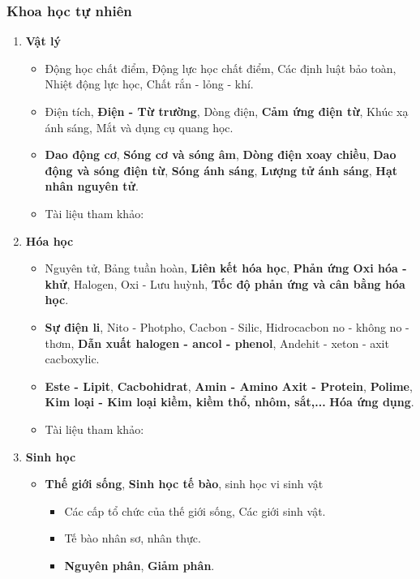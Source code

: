 \subsubsection{Khoa học tự nhiên}
\begin{enumerate}
    \item \textbf{Vật lý}
    \begin{itemize}
        \item Động học chất điểm, Động lực học chất điểm, Các định luật bảo toàn, Nhiệt động lực học, Chất rắn - lỏng - khí.
        \item Điện tích, \textbf{Điện - Từ trường}, Dòng điện, \textbf{Cảm ứng điện từ}, Khúc xạ ánh sáng, Mắt và dụng cụ quang học.
        \item \textbf{Dao động cơ}, \textbf{Sóng cơ và sóng âm}, \textbf{Dòng điện xoay chiều}, \textbf{Dao động và sóng điện từ}, \textbf{Sóng ánh sáng}, \textbf{Lượng tử ánh sáng}, \textbf{Hạt nhân nguyên tử}.
        \item Tài liệu tham khảo: 
    \end{itemize}
    \item \textbf{Hóa học}
    \begin{itemize}
        \item Nguyên tử, Bảng tuần hoàn, \textbf{Liên kết hóa học}, \textbf{Phản ứng Oxi hóa - khử}, Halogen, Oxi - Lưu huỳnh, \textbf{Tốc độ phản ứng và cân bằng hóa học}. 
        \item \textbf{Sự điện li}, Nito - Photpho, Cacbon - Silic, Hidrocacbon no - không no - thơm, \textbf{Dẫn xuất halogen - ancol - phenol}, Andehit - xeton - axit cacboxylic.
        \item \textbf{Este - Lipit}, \textbf{Cacbohidrat}, \textbf{Amin - Amino Axit - Protein}, \textbf{Polime}, \textbf{Kim loại - Kim loại kiềm, kiềm thổ, nhôm, sắt,...} \textbf{Hóa ứng dụng}.
        \item Tài liệu tham khảo: 
    \end{itemize}
    \item \textbf{Sinh học}
    \begin{itemize}
        \item \textbf{Thế giới sống}, \textbf{Sinh học tế bào}, sinh học vi sinh vật
        \begin{itemize}
            \item Các cấp tổ chức của thế giới sống, Các giới sinh vật.
            \item Tế bào nhân sơ, nhân thực.
            \item \textbf{Nguyên phân}, \textbf{Giảm phân}.

\end{itemize}
\end{itemize}
\end{enumerate}
